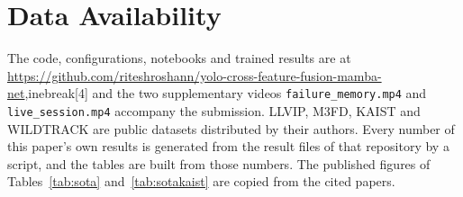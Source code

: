 \section*{Data Availability}
The code, configurations, notebooks and trained results are at \url{https://github.com/riteshroshann/yolo-cross-feature-fusion-mamba-net},inebreak[4] and the two supplementary videos \texttt{failure\_memory.mp4} and \texttt{live\_session.mp4} accompany the submission. LLVIP, M3FD, KAIST and WILDTRACK are public datasets distributed by their authors. Every number of this paper's own results is generated from the result files of that repository by a script, and the tables are built from those numbers. The published figures of Tables~\ref{tab:sota} and~\ref{tab:sotakaist} are copied from the cited papers.
